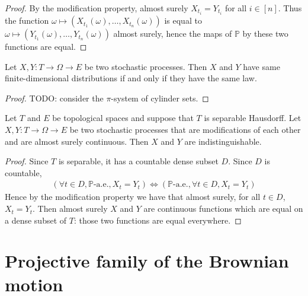 \begin{proof}\leanok
By the modification property, almost surely $X_{t_i} = Y_{t_i}$ for all $i \in [n]$.
Thus the function $\omega \mapsto (X_{t_1}(\omega), \ldots, X_{t_n}(\omega))$ is equal to $\omega \mapsto (Y_{t_1}(\omega), \ldots, Y_{t_n}(\omega))$ almost surely, hence the maps of $\mathbb{P}$ by these two functions are equal.
\end{proof}


\begin{lemma}\label{lem:map_eq_iff}
  \mathlibok
Let $X, Y : T \to \Omega \to E$ be two stochastic processes.
Then $X$ and $Y$ have same finite-dimensional distributions if and only if they have the same law.
\end{lemma}

\begin{proof}\leanok
TODO: consider the $\pi$-system of cylinder sets.
\end{proof}


\begin{lemma}\label{lem:indistinguishable_of_modification_of_continuous}
  \leanok
Let $T$ and $E$ be topological spaces and suppose that $T$ is separable Hausdorff.
Let $X, Y : T \to \Omega \to E$ be two stochastic processes that are modifications of each other and are almost surely continuous.
Then $X$ and $Y$ are indistinguishable.
\end{lemma}

\begin{proof}\leanok
Since $T$ is separable, it has a countable dense subset $D$.
Since $D$ is countable,
\begin{align*}
  (\forall t \in D, \mathbb{P}\text{-a.e.}, X_t = Y_t)
  \iff (\mathbb{P}\text{-a.e.}, \forall t \in D, X_t = Y_t)
\end{align*}
Hence by the modification property we have that almost surely, for all $t \in D$, $X_t = Y_t$.
Then almost surely $X$ and $Y$ are continuous functions which are equal on a dense subset of $T$: those two functions are equal everywhere.
\end{proof}


\chapter{Projective family of the Brownian motion}
\label{chap:projective_family}



